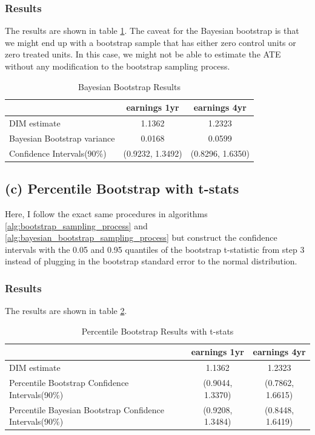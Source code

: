 \documentclass[11pt]{article}
\numberwithin{equation}{section}
\begin{document}
\subsubsection{Results}

The results are shown in table \ref{tab:bayesian_bootstrap_results}.
The caveat for the Bayesian bootstrap is that we might end up with a bootstrap sample that has either zero control units or zero treated units.
In this case, we might not be able to estimate the ATE without any modification to the bootstrap sampling process.

\begin{table}[h]
    \centering
    \begin{tabular}{lcc}
        \hline
         & earnings 1yr & earnings 4yr \\
        \hline
        DIM estimate & 1.1362  & 1.2323 \\
        Bayesian Bootstrap variance &  0.0168 & 0.0599 \\
        Confidence Intervals(90\%) & (0.9232, 1.3492) & (0.8296, 1.6350) \\
        \hline
    \end{tabular}
    \caption{\label{tab:bayesian_bootstrap_results}Bayesian Bootstrap Results}
\end{table}


\subsection{(c) Percentile Bootstrap with t-stats}



Here, I follow the exact same procedures in algorithms \ref{alg:bootstrap_sampling_process} and \ref{alg:bayesian_bootstrap_sampling_process} but construct the confidence intervals with the 0.05 and 0.95 quantiles of the bootstrap t-statistic from step 3 instead of plugging in the bootstrap standard error to the normal distribution.

\subsubsection{Results}

The results are shown in table \ref{tab:percentile_bootstrap_results}.


\begin{table}[h]
    \centering
    \begin{tabular}{lcc}
        \hline
         & earnings 1yr & earnings 4yr \\
        \hline
        DIM estimate & 1.1362  & 1.2323 \\
        Percentile Bootstrap Confidence Intervals(90\%) & (0.9044, 1.3370) & (0.7862, 1.6615) \\
        Percentile Bayesian Bootstrap Confidence Intervals(90\%) & (0.9208, 1.3484) & (0.8448, 1.6419) \\
        \hline
    \end{tabular}
    \caption{\label{tab:percentile_bootstrap_results}Percentile Bootstrap Results with t-stats}
\end{table}
\end{document}
